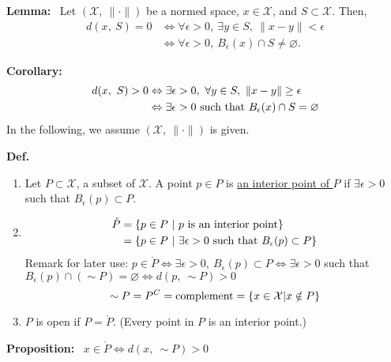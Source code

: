 \documentclass[letterpaper]{article}
\begin{document}
\noindent \textbf{Lemma:}~ Let $\left(\mathcal{X},\ \|\cdot\|\right)$ be a normed space, $x\in\mathcal{X}$, and $S\subset\mathcal{X}$. Then,
    \begin{align*}
        d(x,\ S)=0 &\Leftrightarrow \forall\epsilon>0,\ \exists y\in S,\ \|x-y\|<\epsilon\\
        &\Leftrightarrow \forall\epsilon>0,\ B_\epsilon(x)\cap S\neq \varnothing.
    \end{align*}

\noindent \textbf{Corollary:}
    \begin{align*}
        d(x,\ S)>0 &\Leftrightarrow \exists\epsilon>0,\ \forall y\in S,\ \|x-y\|\geq\epsilon\\
        &\Leftrightarrow \exists\epsilon>0 \textnormal{ such that } B_\epsilon(x)\cap S = \varnothing
    \end{align*}
    In the following, we assume $\left(\mathcal{X},\ \|\cdot\|\right)$ is given.

\noindent \textbf{Def.}~
    \begin{enumerate}
        \item Let $P\subset\mathcal{X}$, a subset of $\mathcal{X}$. A point $p\in P$ is \underline{an interior point of $P$} if $\exists\epsilon>0$ such that $B_\epsilon(p)\subset P$.
        \item \begin{align*}
                \mathring{P}&=\{p\in P\ |\ p\textnormal{ is an interior point}\}\\
                &=\{p\in P\ |\ \exists\epsilon>0\textnormal{ such that } B_\epsilon(p)\subset P\}
            \end{align*}
            Remark for later use: $p\in \mathring{P}\Leftrightarrow\exists\epsilon>0,\ B_\epsilon(p)\subset P\Leftrightarrow\exists\epsilon>0$ such that $B_\epsilon(p)\cap(\sim P)=\varnothing\Leftrightarrow d(p,\ \sim P)>0$
            \begin{equation*}
                \sim P = P^C=\textnormal{complement}=\{x\in\mathcal{X}|x\notin P\}
            \end{equation*}
        \item $P$ is open if $P=\mathring{P}$. (Every point in $P$ is an interior point.)
    \end{enumerate}

\noindent \textbf{Proposition:}~ $x\in \mathring{P}\Leftrightarrow d(x,\ \sim P)>0$
\end{document}
